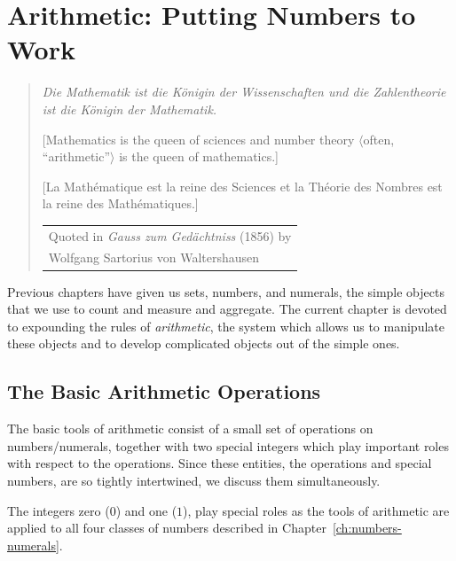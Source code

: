 
\chapter{Arithmetic: Putting Numbers to Work}
\label{ch:arithmetic}


\hfill
\begin{quote}
{\it Die Mathematik ist die K\"{o}nigin der Wissenschaften und die
Zahlentheorie ist die K\"{o}nigin der Mathematik.}

[Mathematics is the queen of sciences and number theory $\langle$often, ``arithmetic''$\rangle$ is the queen of mathematics.]
  
[La Math\'ematique est la reine des Sciences et la Th\'eorie des Nombres est la reine des Math\'ematiques.]

\hfill
\begin{tabular}{l}
Quoted in {\it Gauss zum Gedächtniss} (1856) by \\
Wolfgang Sartorius von Waltershausen 
\end{tabular}
\end{quote}

\bigskip

\noindent
Previous chapters have given us sets, numbers, and numerals, the simple objects that we use to count and measure and aggregate.  The current chapter is devoted to expounding the rules of {\em arithmetic}, the system which allows us to manipulate these objects and to develop complicated objects out of the simple ones.

\section{The Basic Arithmetic Operations}
\label{sec:Arithmetic-Tools}

The basic tools of arithmetic consist of a small set of operations on numbers/numerals, together with two special integers which play important roles with respect to the operations.  Since these entities, the operations and special numbers, are so tightly intertwined, we discuss them simultaneously.

\smallskip



The integers zero ($0$)  and one ($1$), play special roles as the tools of arithmetic are applied to all four classes of numbers described in Chapter~\ref{ch:numbers-numerals}.

